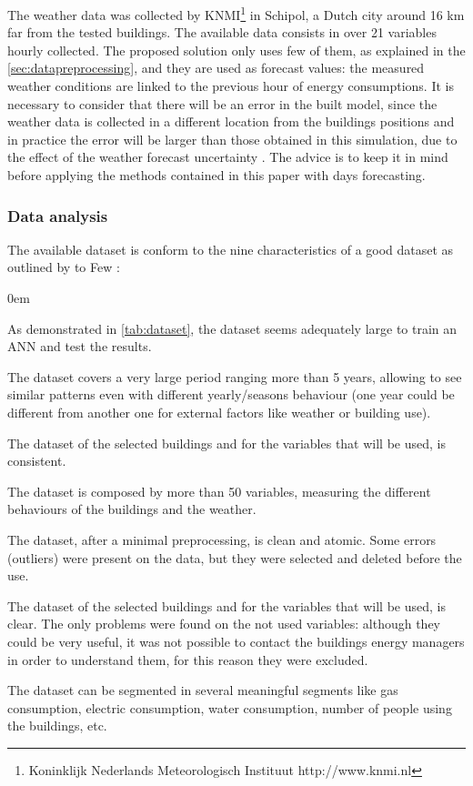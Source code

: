 \documentclass{sig-alternate-sigmod07}
\begin{document}
The weather data was collected by KNMI\footnote{Koninklijk Nederlands Meteorologisch Instituut http://www.knmi.nl} in Schipol, a Dutch city around 16 km far from the tested buildings. The available data consists in over 21 variables hourly collected. The proposed solution only uses few of them, as explained in the \cref{sec:datapreprocessing}, and they are used as forecast values: the measured weather conditions are linked to the previous hour of energy consumptions. It is necessary to consider that there will be an error in the built model, since the weather data is collected in a different location from the buildings positions and in practice the error will be larger than those obtained in this simulation, due to the effect of the weather forecast uncertainty \cite{douglas1998impacts, ranaweera1996effect}. The advice is to keep it in mind before applying the methods contained in this paper with days forecasting.

\subsubsection{Data analysis}
\label{sec:dataAnalysis}

The available dataset is conform to the nine characteristics of a good dataset as outlined by to Few \cite{few2009now}:
\begin{description}
\itemsep0em
  \item[Volume] As demonstrated in \cref{tab:dataset}, the dataset seems adequately large to train an ANN and test the results.
  \item[Historical] The dataset covers a very large period ranging more than 5 years, allowing to see similar patterns even with different yearly/seasons behaviour (one year could be different from another one for external factors like weather or building use). 
  \item[Consistent] The dataset of the selected buildings and for the variables that will be used, is consistent.
  \item[Multivariate] The dataset is composed by more than 50 variables, measuring the different behaviours of the buildings and the weather.
\item[Clean-Atomic] The dataset, after a minimal preprocessing, is clean and atomic. Some errors (outliers) were present on the data, but they were selected and deleted before the use.
\item[Clear] The dataset of the selected buildings and for the variables that will be used, is clear. The only problems were found on the not used variables: although they could be very useful, it was not possible to contact the buildings energy managers in order to understand them, for this reason they were excluded.
\item[Richy Segmented] The dataset can be segmented in several meaningful segments like gas consumption, electric consumption, water consumption, number of people using the buildings, etc.
\end{description}
\end{document}
